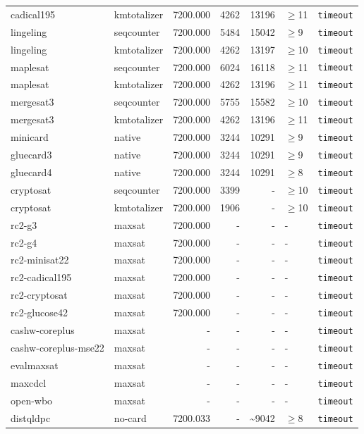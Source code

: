 \begin{longtable}{llrrrl p{}}
cadical195 & kmtotalizer & 7200.000 & 4262 & 13196 & $\geq$11 & \texttt{timeout} \\
lingeling & seqcounter & 7200.000 & 5484 & 15042 & $\geq$9 & \texttt{timeout} \\
lingeling & kmtotalizer & 7200.000 & 4262 & 13197 & $\geq$10 & \texttt{timeout} \\
maplesat & seqcounter & 7200.000 & 6024 & 16118 & $\geq$11 & \texttt{timeout} \\
maplesat & kmtotalizer & 7200.000 & 4262 & 13196 & $\geq$11 & \texttt{timeout} \\
mergesat3 & seqcounter & 7200.000 & 5755 & 15582 & $\geq$10 & \texttt{timeout} \\
mergesat3 & kmtotalizer & 7200.000 & 4262 & 13196 & $\geq$11 & \texttt{timeout} \\
minicard & native & 7200.000 & 3244 & 10291 & $\geq$9 & \texttt{timeout} \\
gluecard3 & native & 7200.000 & 3244 & 10291 & $\geq$9 & \texttt{timeout} \\
gluecard4 & native & 7200.000 & 3244 & 10291 & $\geq$8 & \texttt{timeout} \\
cryptosat & seqcounter & 7200.000 & 3399 & - & $\geq$10 & \texttt{timeout} \\
cryptosat & kmtotalizer & 7200.000 & 1906 & - & $\geq$10 & \texttt{timeout} \\
rc2-g3 & maxsat & 7200.000 & - & - & - & \texttt{timeout} \\
rc2-g4 & maxsat & 7200.000 & - & - & - & \texttt{timeout} \\
rc2-minisat22 & maxsat & 7200.000 & - & - & - & \texttt{timeout} \\
rc2-cadical195 & maxsat & 7200.000 & - & - & - & \texttt{timeout} \\
rc2-cryptosat & maxsat & 7200.000 & - & - & - & \texttt{timeout} \\
rc2-glucose42 & maxsat & 7200.000 & - & - & - & \texttt{timeout} \\
cashw-coreplus & maxsat & - & - & - & - & \texttt{timeout} \\
cashw-coreplus-mse22 & maxsat & - & - & - & - & \texttt{timeout} \\
evalmaxsat & maxsat & - & - & - & - & \texttt{timeout} \\
maxcdcl & maxsat & - & - & - & - & \texttt{timeout} \\
open-wbo & maxsat & - & - & - & - & \texttt{timeout} \\
distqldpc & no-card & 7200.033 & - & \textasciitilde{}9042 & $\geq$8 & \texttt{timeout} \\

\end{longtable}

